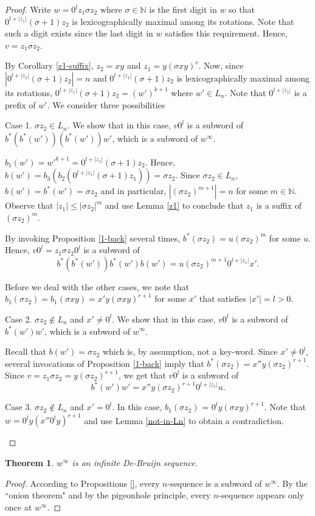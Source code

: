 \documentclass{article}
\newtheorem{theorem}{Theorem}
\theoremstyle{definition}
\newcommand{\N}{{\mathbb{N}}}
\begin{document}
\begin{proof}
Write $w=0^lz_1\sigma z_2$ where $\sigma\in \N$ is the first digit in $w$ so that  $0^{l+|z_1|}(\sigma+1)z_2$ is lexicographically maximal among its rotations. Note that such a digit exists since the last digit in $w$ satisfies this requirement. Hence, $v=z_1\sigma z_2$.

By Corollary \ref{z1-suffix}, $z_2=xy$ and $z_1=y(\sigma xy)^r$. Now, since $|0^{l+|z_1|}(\sigma+1)z_2|=n$ and $0^{l+|z_1|}(\sigma+1)z_2$ is lexicographically maximal among its rotations, $0^{l+|z_1|}(\sigma+1)z_2=(w')^{k+1}$ where $w'\in L_n$. Note that $0^{l+|z_1|}$ is a prefix of $w'$. We consider three possibilities

\begin{description}

\item{Case 1.}  $\sigma z_2\in L_n$. We show that in this case, $v0^l$ is a subword of $b^*(b^*(w'))(b^*(w'))w'$, which is a subword of $w^\infty$.

$b_1(w')=w'^{k+1}=0^{l+|z_1|}(\sigma+1)z_2$. Hence, $b(w')=b_3(b_2(0^{l+|z_1|}(\sigma+1)z_1))=\sigma z_2$. Since $\sigma z_2\in L_n$, $b(w')=b^*(w')=\sigma z_2$ and in particular, $|(\sigma z_2)^{m+1}|=n$ for some $m\in \N$. Observe that $|z_1|\leq |\sigma z_2|^m$ and use Lemma \ref{z1} to conclude that $z_1$ is a suffix of $(\sigma z_2)^m$.  

By invoking Proposition \ref{1-back} several times, $b^*(\sigma z_2)= u(\sigma z_2)^m$ for some $u$. Hence, $v0^l=z_1\sigma z_2 0^l$ is a subword of 
$$b^*(b^*(w'))b^*(w')b(w')=u(\sigma z_2)^{m+1}0^{l+|z_1|}x'.$$


\end{description}

Before we deal with the other cases, we note that $b_1(\sigma z_2)=b_1(\sigma xy)=x'y(\sigma xy)^{r+1}$ for some $x'$ that satisfies $|x'|=l>0$.

\begin{description}
\item{Case 2.} $\sigma z_2\notin L_n$  and $x'\neq 0^l$. We show that in this case, $v0^l$ is a subword of $b^*(w')w'$, which is a subword of $w^\infty$.

Recall that $b(w')=\sigma z_2$ which is, by assumption, not a key-word. Since $x'\neq 0^l$, several invocations of Proposition \ref{1-back} imply that $b^*(\sigma z_2)=x''y(\sigma z_2)^{r+1}$. Since $v=z_1\sigma z_2=y(\sigma z_2)^{r+1}$, we get that $v0^l$ is a subword of 
$$b^*(w')w'=x''y(\sigma z_2)^{r+1}0^{l+|z_1|}u.$$


\item{Case 3.} $\sigma z_2\notin L_n$  and $x'=0^l$. In this case, $b_1(\sigma z_2)$ = $0^ly(\sigma xy)^{r+1}$. Note that $w=0^ly(x''0^ly)^{r+1}$ and use Lemma \ref{not-in-Ln} to obtain a contradiction.

\end{description}

 
\end{proof}

\begin{theorem}
$w^\infty$ is an infinite De-Bruijn sequence.
\end{theorem}

\begin{proof}
According to Propositions \ref{}, every $n$-sequence is a subword of $w^\infty$. By the ``onion theorem" and by the pigeonhole principle, every $n$-sequence appears only once at $w^\infty$.
\end{proof}
\end{document}
